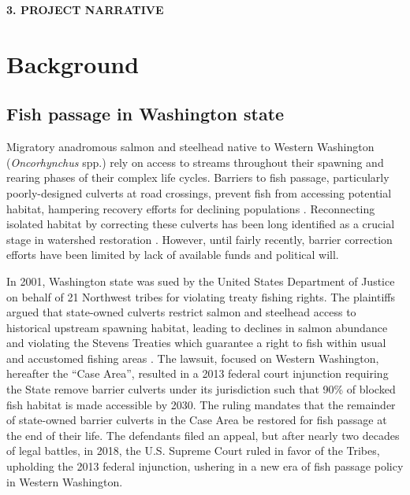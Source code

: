 \renewcommand\thesection{\Alph{section}}

\begin{center} \textbf{3. PROJECT NARRATIVE} \end{center}

\section{Background}

\subsection*{Fish passage in Washington state}

Migratory anadromous salmon and steelhead native to Western Washington (\textit{Oncorhynchus} spp.) rely on access to streams throughout their spawning and rearing phases of their complex life cycles. Barriers to fish passage, particularly poorly-designed culverts at road crossings, prevent fish from accessing potential habitat, hampering recovery efforts for declining populations \citep{noauthor_2020_2020}. Reconnecting isolated habitat by correcting these culverts has been long identified as a crucial stage in watershed restoration \citep{roni_review_2002}. However, until fairly recently, barrier correction efforts have been limited by lack of available funds and political will. 

In 2001, Washington state was sued by the United States Department of Justice on behalf of 21 Northwest tribes for violating treaty fishing rights. The plaintiffs argued that state-owned culverts restrict salmon and steelhead access to historical upstream spawning habitat, leading to declines in salmon abundance and violating the Stevens Treaties which guarantee a right to fish within usual and accustomed fishing areas \citep{hickey_highway_2018}. The lawsuit, focused on Western Washington, hereafter the ``Case Area'', resulted in a 2013 federal court injunction requiring the State remove barrier culverts under its jurisdiction such that 90\% of blocked fish habitat is made accessible by 2030. The ruling mandates that the remainder of state-owned barrier culverts in the Case Area be restored for fish passage at the end of their life. The defendants filed an appeal, but after nearly two decades of legal battles, in 2018, the U.S. Supreme Court ruled in favor of the Tribes, upholding the 2013 federal injunction, ushering in a new era of fish passage policy in Western Washington. 


